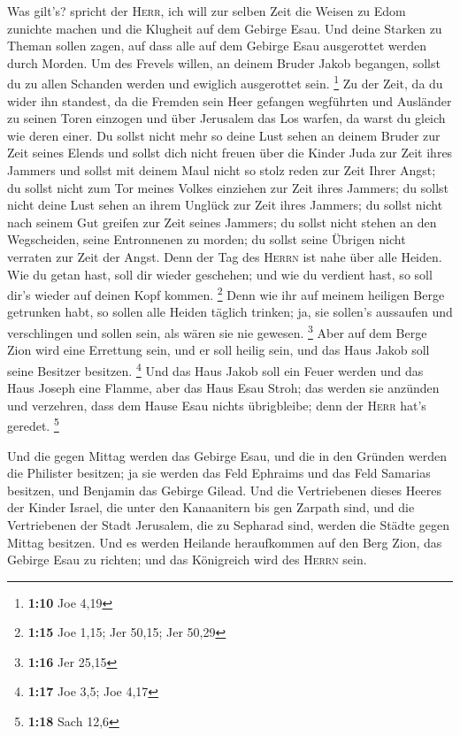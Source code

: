  Was gilt's? spricht der \textsc{Herr}, ich will zur
selben Zeit die Weisen zu Edom zunichte machen und die Klugheit auf dem
Gebirge Esau.  Und deine Starken zu Theman sollen zagen,
auf dass alle auf dem Gebirge Esau ausgerottet werden durch Morden.
 Um des Frevels willen, an deinem Bruder Jakob begangen,
sollst du zu allen Schanden werden und ewiglich ausgerottet sein.
\footnote{\textbf{1:10} Joe 4,19}  Zu der Zeit, da du
wider ihn standest, da die Fremden sein Heer gefangen wegführten und
Ausländer zu seinen Toren einzogen und über Jerusalem das Los warfen, da
warst du gleich wie deren einer.  Du sollst nicht mehr so
deine Lust sehen an deinem Bruder zur Zeit seines Elends und sollst dich
nicht freuen über die Kinder Juda zur Zeit ihres Jammers und sollst mit
deinem Maul nicht so stolz reden zur Zeit Ihrer Angst; 
du sollst nicht zum Tor meines Volkes einziehen zur Zeit ihres Jammers;
du sollst nicht deine Lust sehen an ihrem Unglück zur Zeit ihres
Jammers; du sollst nicht nach seinem Gut greifen zur Zeit seines
Jammers;  du sollst nicht stehen an den Wegscheiden,
seine Entronnenen zu morden; du sollst seine Übrigen nicht verraten zur
Zeit der Angst.  Denn der Tag des \textsc{Herrn} ist nahe
über alle Heiden. Wie du getan hast, soll dir wieder geschehen; und wie
du verdient hast, so soll dir's wieder auf deinen Kopf kommen.
\footnote{\textbf{1:15} Joe 1,15; Jer 50,15; Jer 50,29} 
Denn wie ihr auf meinem heiligen Berge getrunken habt, so sollen alle
Heiden täglich trinken; ja, sie sollen's aussaufen und verschlingen und
sollen sein, als wären sie nie gewesen. \footnote{\textbf{1:16} Jer
  25,15}  Aber auf dem Berge Zion wird eine Errettung
sein, und er soll heilig sein, und das Haus Jakob soll seine Besitzer
besitzen. \footnote{\textbf{1:17} Joe 3,5; Joe 4,17}  Und
das Haus Jakob soll ein Feuer werden und das Haus Joseph eine Flamme,
aber das Haus Esau Stroh; das werden sie anzünden und verzehren, dass
dem Hause Esau nichts übrigbleibe; denn der \textsc{Herr} hat's geredet.
\footnote{\textbf{1:18} Sach 12,6}

 Und die gegen Mittag werden das Gebirge Esau, und die in
den Gründen werden die Philister besitzen; ja sie werden das Feld
Ephraims und das Feld Samarias besitzen, und Benjamin das Gebirge
Gilead.  Und die Vertriebenen dieses Heeres der Kinder
Israel, die unter den Kanaanitern bis gen Zarpath sind, und die
Vertriebenen der Stadt Jerusalem, die zu Sepharad sind, werden die
Städte gegen Mittag besitzen.  Und es werden Heilande
heraufkommen auf den Berg Zion, das Gebirge Esau zu richten; und das
Königreich wird des \textsc{Herrn} sein.
